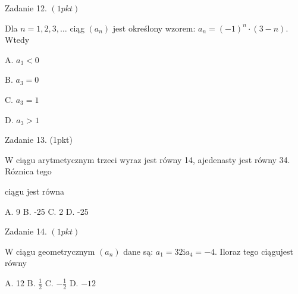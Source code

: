 \documentclass[a4paper,12pt]{article}
\begin{document}
Zadanie 12. $(1pkt)$

Dla $ n=1,2,3,\ldots$ ciąg $(a_{n})$ jest określony wzorem: $a_{n}=(-1)^{n}\cdot(3-n)$. Wtedy

A. $a_{3}<0$

B. $a_{3}=0$

C. $a_{3}=1$

D. $a_{3}>1$

Zadanie 13. (1pkt)

W ciągu arytmetycznym trzeci wyraz jest równy 14, ajedenasty jest równy 34. Róznica tego

ciągu jest równa

A. 9 B. -25 C. 2 D. -25

Zadanie 14. $(1pkt)$

$\mathrm{W}$ ciągu geometrycznym $(a_{n})$ dane są: $a_{1}=32 \mathrm{i}a_{4}=-4$. Iloraz tego ciągujest równy

A. 12 B. $\displaystyle \frac{1}{2}$ C. $-\displaystyle \frac{1}{2}$ D. $-12$
\end{document}
